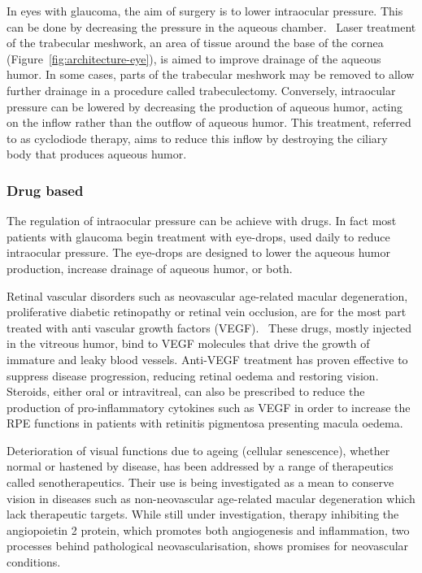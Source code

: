 \documentclass[12pt,a4paper]{journal}
\begin{document}
In eyes with glaucoma, the aim of surgery is to lower intraocular pressure.
This can be done by decreasing the pressure in the aqueous chamber.~\cite{Quigley_2011}
Laser treatment of the trabecular meshwork, an area of tissue around the base of the cornea (Figure~\ref{fig:architecture-eye}), is aimed to improve drainage of the aqueous humor.
In some cases, parts of the trabecular meshwork may be removed to allow further drainage in a procedure called trabeculectomy.
Conversely, intraocular pressure can be lowered by decreasing the production of aqueous humor, acting on the inflow rather than the outflow of aqueous humor.
This treatment, referred to as cyclodiode therapy, aims to reduce this inflow by destroying the ciliary body that produces aqueous humor.~\cite{Allbon_2022}

\subsubsection*{Drug based}

The regulation of intraocular pressure can be achieve with drugs.
In fact most patients with glaucoma begin treatment with eye-drops, used daily to reduce intraocular pressure.
The eye-drops are designed to lower the aqueous humor production, increase drainage of aqueous humor, or both.~\cite{Chakrabarti_2022,Quigley_2011}

Retinal vascular disorders such as neovascular age-related macular degeneration, proliferative diabetic retinopathy or retinal vein occlusion, are for the most part treated with anti vascular growth factors (VEGF).~\cite{Andreoli_2007,Kim_2021}
These drugs, mostly injected in the vitreous humor, bind to VEGF molecules that drive the growth of immature and leaky blood vessels.
Anti-VEGF treatment has proven effective to suppress disease progression, reducing retinal oedema and restoring vision.~\cite{Andreoli_2007,Heier_2006,Kim_2021}
Steroids, either oral or intravitreal, can also be prescribed to reduce the production of pro-inflammatory cytokines such as VEGF in order to increase the RPE functions in patients with retinitis pigmentosa presenting macula oedema.~\cite{Strong_2016}

Deterioration of visual functions due to ageing (cellular senescence), whether normal or hastened by disease, has been addressed by a range of therapeutics called senotherapeutics.
Their use is being investigated as a mean to conserve vision in diseases such as non-neovascular age-related macular degeneration which lack therapeutic targets.\cite{Lee_2021}
While still under investigation, therapy inhibiting the angiopoietin 2 protein, which promotes both angiogenesis and inflammation, two processes behind pathological neovascularisation, shows promises for neovascular conditions.\cite{Regula_2016}
\end{document}
